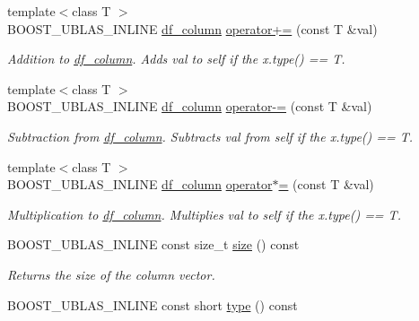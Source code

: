 \begin{DoxyCompactItemize}
{\footnotesize template$<$class T $>$ }\\B\+O\+O\+S\+T\+\_\+\+U\+B\+L\+A\+S\+\_\+\+I\+N\+L\+I\+NE \hyperlink{classboost_1_1numeric_1_1ublas_1_1df__column}{df\+\_\+column} \hyperlink{classboost_1_1numeric_1_1ublas_1_1df__column_a1682319558b78770e55fe8a49039c625}{operator+=} (const T \&val)
\begin{DoxyCompactList}\small\item\em Addition to \hyperlink{classboost_1_1numeric_1_1ublas_1_1df__column}{df\+\_\+column}. Adds val to self if the {\ttfamily x.\+type()} == T. \end{DoxyCompactList}\item 
{\footnotesize template$<$class T $>$ }\\B\+O\+O\+S\+T\+\_\+\+U\+B\+L\+A\+S\+\_\+\+I\+N\+L\+I\+NE \hyperlink{classboost_1_1numeric_1_1ublas_1_1df__column}{df\+\_\+column} \hyperlink{classboost_1_1numeric_1_1ublas_1_1df__column_a5497192fe12327e3ebf36d474c5c24d9}{operator-\/=} (const T \&val)
\begin{DoxyCompactList}\small\item\em Subtraction from \hyperlink{classboost_1_1numeric_1_1ublas_1_1df__column}{df\+\_\+column}. Subtracts val from self if the {\ttfamily x.\+type()} == T. \end{DoxyCompactList}\item 
{\footnotesize template$<$class T $>$ }\\B\+O\+O\+S\+T\+\_\+\+U\+B\+L\+A\+S\+\_\+\+I\+N\+L\+I\+NE \hyperlink{classboost_1_1numeric_1_1ublas_1_1df__column}{df\+\_\+column} \hyperlink{classboost_1_1numeric_1_1ublas_1_1df__column_a7399e3020da8d82c3c7158e665b530f8}{operator$\ast$=} (const T \&val)
\begin{DoxyCompactList}\small\item\em Multiplication to \hyperlink{classboost_1_1numeric_1_1ublas_1_1df__column}{df\+\_\+column}. Multiplies val to self if the {\ttfamily x.\+type()} == T. \end{DoxyCompactList}\item 
B\+O\+O\+S\+T\+\_\+\+U\+B\+L\+A\+S\+\_\+\+I\+N\+L\+I\+NE const size\+\_\+t \hyperlink{classboost_1_1numeric_1_1ublas_1_1df__column_a595e1a88f2d9592047f77d08c438e0c2}{size} () const 
\begin{DoxyCompactList}\small\item\em Returns the size of the column vector. \end{DoxyCompactList}\item 
B\+O\+O\+S\+T\+\_\+\+U\+B\+L\+A\+S\+\_\+\+I\+N\+L\+I\+NE const short \hyperlink{classboost_1_1numeric_1_1ublas_1_1df__column_aaa35a9b56c7d4b60b6793e875b45f685}{type} () const 

\end{DoxyCompactItemize}
